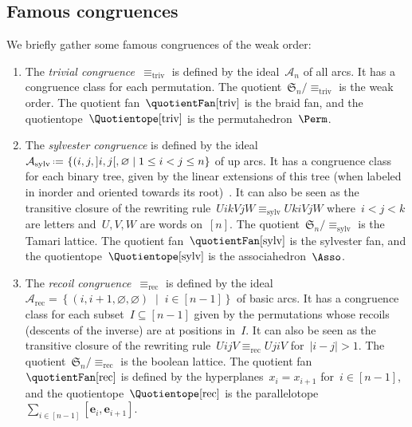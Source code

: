 \documentclass{amsart}
\theoremstyle{definition}
\newcommand{\f}[1]{{\mathfrak{#1}}} %
\renewcommand{\b}[1]{{\boldsymbol{#1}}} %
\newcommand{\set}[2]{\left\{ #1 \;\middle|\; #2 \right\}} %
\newcommand{\eqdef}{\mbox{\,\raisebox{0.2ex}{\scriptsize\ensuremath{\mathrm:}}\ensuremath{=}\,}} %
\newcommand{\darkblue}{\color{darkblue}} %
\newcommand{\defn}[1]{\textsl{\darkblue #1}} %
\newcommand{\arcs}{{\mathcal{A}}} %
\begin{document}

\subsection{Famous congruences}
\label{subsec:famousCongruences}

We briefly gather some famous congruences of the weak order:

\begin{enumerate}
\item \label{item:trivialCongruence}
The \defn{trivial congruence}~$\equiv_\textrm{triv}$ is defined by the ideal~$\arcs_n$ of all arcs.
It has a congruence class for each permutation.
The quotient~$\f{S}_n/{\equiv_\textrm{triv}}$ is the weak order.
The quotient fan~$\quotientFan[\textrm{triv}]$ is the braid fan, and the quotientope~$\Quotientope[\textrm{triv}]$ is the permutahedron~$\Perm$.

\item \label{item:sylvesterCongruence}
The \defn{sylvester congruence} is defined by the ideal~$\arcs_\textrm{sylv} \eqdef \set{(i, j, {]i,j[}, \varnothing}{1 \le i < j \le n}$ of up arcs.
It has a congruence class for each binary tree, given by the linear extensions of this tree (when labeled in inorder and oriented towards its root)~\cite{Tonks, HivertNovelliThibon-algebraBinarySearchTrees}.
It can also be seen as the transitive closure of the rewriting rule~$U i k V j W \equiv_\textrm{sylv} U k i V j W$ where~$i < j < k$ are letters and~$U,V,W$ are words on~$[n]$.
The quotient~$\f{S}_n/{\equiv_\textrm{sylv}}$ is the Tamari lattice.
The quotient fan~$\quotientFan[\textrm{sylv}]$ is the sylvester fan, and the quotientope~$\Quotientope[\textrm{sylv}]$ is the associahedron~$\Asso$.

\item \label{item:recoilCongruence}
The \defn{recoil congruence}~$\equiv_\textrm{rec}$ is defined by the ideal~$\arcs_\textrm{rec} = \set{(i, i+1, \varnothing, \varnothing)}{i \in [n-1]}$ of basic arcs.
It has a congruence class for each subset~$I \subseteq [n-1]$ given by the permutations whose recoils (descents of the inverse) are at positions in~$I$.
It can also be seen as the transitive closure of the rewriting rule~$U i j V \equiv_{\textrm{rec}} U j i V$ for~$|i - j| > 1$.
The quotient~$\f{S}_n/{\equiv_\textrm{rec}}$ is the boolean lattice.
The quotient fan~$\quotientFan[\textrm{rec}]$ is defined by the hyperplanes~$x_i = x_{i+1}$ for~$i \in [n-1]$, and the quotientope~$\Quotientope[\textrm{rec}]$ is the parallelotope~$\sum_{i \in [n-1]} [\b{e}_i, \b{e}_{i+1}]$.


\end{enumerate}
\end{document}
